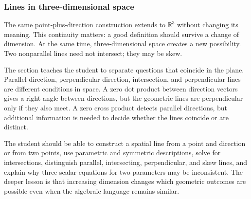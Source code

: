 \subsubsection*{Lines in three-dimensional space}

The same point-plus-direction construction extends to $\mathbb R^3$ without
changing its meaning. This continuity matters: a good definition should survive
a change of dimension. At the same time, three-dimensional space creates a new
possibility. Two nonparallel lines need not intersect; they may be skew.

The section teaches the student to separate questions that coincide in the plane.
Parallel direction, perpendicular direction, intersection, and perpendicular
lines are different conditions in space. A zero dot product between direction
vectors gives a right angle between directions, but the geometric lines are
perpendicular only if they also meet. A zero cross product detects parallel
directions, but additional information is needed to decide whether the lines
coincide or are distinct.

The student should be able to construct a spatial line from a point and direction
or from two points, use parametric and symmetric descriptions, solve for
intersections, distinguish parallel, intersecting, perpendicular, and skew lines,
and explain why three scalar equations for two parameters may be inconsistent.
The deeper lesson is that increasing dimension changes which geometric outcomes
are possible even when the algebraic language remains similar.
